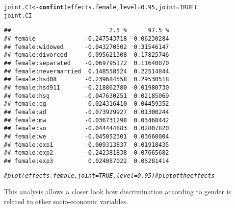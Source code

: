 \documentclass{amsart}\usepackage[]{graphicx}\usepackage[]{color}
\makeatletter
\newcommand{\hlnum}[1]{\textcolor[rgb]{0.686,0.059,0.569}{#1}}%
\newcommand{\hlcom}[1]{\textcolor[rgb]{0.678,0.584,0.686}{\textit{#1}}}%
\newcommand{\hlstd}[1]{\textcolor[rgb]{0.345,0.345,0.345}{#1}}%
\newcommand{\hlkwb}[1]{\textcolor[rgb]{0.69,0.353,0.396}{#1}}%
\newcommand{\hlkwc}[1]{\textcolor[rgb]{0.333,0.667,0.333}{#1}}%
\newcommand{\hlkwd}[1]{\textcolor[rgb]{0.737,0.353,0.396}{\textbf{#1}}}%
\newenvironment{kframe}{%
 \def\at@end@of@kframe{}%
 \ifinner\ifhmode%
  \def\at@end@of@kframe{\end{minipage}}%
  \begin{minipage}{\columnwidth}%
 \fi\fi%
 \def\FrameCommand##1{\hskip\@totalleftmargin \hskip-\fboxsep
 \colorbox{shadecolor}{##1}\hskip-\fboxsep
     \hskip-\linewidth \hskip-\@totalleftmargin \hskip\columnwidth}%
 \MakeFramed {\advance\hsize-\width
   \@totalleftmargin\z@ \linewidth\hsize
   \@setminipage}}%
 {\par\unskip\endMakeFramed%
 \at@end@of@kframe}
\newenvironment{knitrout}{}{} %
\makeatother
\begin{document}
\begin{knitrout}
\color{fgcolor}\begin{kframe}
\begin{alltt}
\hlstd{joint.CI} \hlkwb{<-} \hlkwd{confint}\hlstd{(effects.female,} \hlkwc{level} \hlstd{=} \hlnum{0.95}\hlstd{,} \hlkwc{joint} \hlstd{=} \hlnum{TRUE}\hlstd{)}
\hlstd{joint.CI}
\end{alltt}
\begin{verbatim}
##                            2.5 %      97.5 %
## female              -0.247543718 -0.06230284
## female:widowed      -0.043270502  0.31546147
## female:divorced      0.095621308  0.17825746
## female:separated    -0.069795172  0.11640070
## female:nevermarried  0.148558524  0.22514844
## female:hsd08        -0.239684558  0.29530518
## female:hsd911       -0.218862780 -0.01980730
## female:hsg          -0.047630251  0.02185069
## female:cg           -0.024316410  0.04459352
## female:ad           -0.073929927  0.01300244
## female:mw           -0.036731298  0.03460442
## female:so           -0.044444883  0.02807820
## female:we           -0.045052301  0.03660004
## female:exp1         -0.009313837  0.01918435
## female:exp2         -0.242381838 -0.07665682
## female:exp3          0.024087022  0.05281414
\end{verbatim}
\begin{alltt}
\hlcom{# plot(effects.female, joint=TRUE, level=0.95) # plot of the effects}
\end{alltt}
\end{kframe}
\end{knitrout}

This analysis allows a closer look how discrimination according to gender is related to other socio-economic variables.
\end{document}
